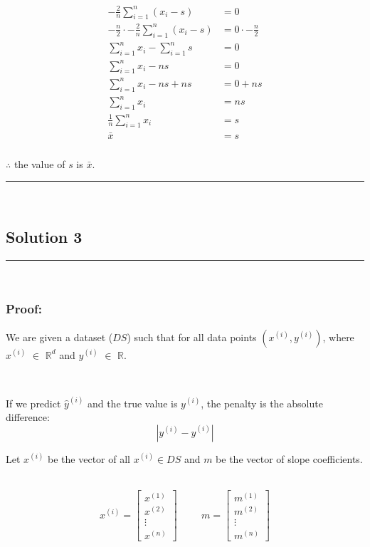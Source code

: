 \documentclass{article}
\begin{document}
\begin{align}
-\frac{2}{n} \sum_{i=1}^{n} (x_i - s) &= 0 \\
-\frac{n}{2} \cdot -\frac{2}{n} \sum_{i=1}^{n} (x_i - s) &= 0 \cdot -\frac{n}{2} \\
\sum_{i=1}^{n} x_i - \sum_{i=1}^{n} s &= 0 \\
\sum_{i=1}^{n} x_i - ns &= 0 \\
\sum_{i=1}^{n} x_i - ns + ns &= 0 + ns \\
\sum_{i=1}^{n} x_i &= ns \\
\frac {1}{n}\sum_{i=1}^{n} x_i &= s \\
\bar{x} &= s
\end{align} 


\subsubsection*{\normalfont}{$\therefore$ the value of $s$ is $\bar{x}$.}

\noindent\rule{\textwidth}{0.4pt}\\

\newpage


\subsection*{Solution 3}
\noindent\rule{\textwidth}{0.4pt}\\

\subsubsection*{Proof:}
\parbox{\textwidth}{
We are given a dataset ($DS$) such that for all data points $(x^{(i)}, y^{(i)})$, where $x^{(i)}$ $\in$ $\mathbb{R}^d$ and $y^{(i)}$ $\in$ $\mathbb{R}$.}\\

\parbox{\textwidth}{If we predict $\hat{y}^{(i)}$ and the true value is $y^{(i)}$, the penalty is the absolute difference:
\[
|y^{(i)} - \hat{y}^{(i)}|
\]
}

\parbox{\textwidth}{
Let $x^{(i)}$ be the vector of all $x^{(i)} \in DS$ and $m$ be the vector of slope coefficients.
}\\

$$
x^{(i)}=\begin{bmatrix}
x^{(1)}\\x^{(2)}\\\vdots\\x^{(n)}
\end{bmatrix}
\hspace{1cm}
m=\begin{bmatrix}
  m^{(1)} \\m^{(2)} \\\vdots \\m^{(n)}
  \end{bmatrix}
$$
\end{document}
